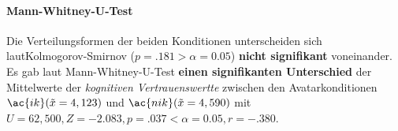 \documentclass[a4paper,11pt]{article}%
\renewcommand{\\}{\vspace*{0.5\baselineskip} \newline}
\begin{document}
\paragraph{Mann-Whitney-U-Test}
Die Verteilungsformen der beiden Konditionen unterscheiden sich laut\newline Kolmogorov-Smirnov ($p = .181 > \alpha = 0.05$) \textbf{nicht signifikant} voneinander. Es gab laut Mann-Whitney-U-Test \textbf{einen signifikanten Unterschied} der Mittelwerte der \textit{kognitiven Vertrauenswertte} zwischen den Avatarkonditionen $\ac{ik} (\tilde x = 4,123)$ und  $\ac{nik} (\tilde x = 4,590)$ mit $U = 62,500 , Z = -2.083, p = .037 < \alpha = 0.05, r =-.380$. \\
\end{document}
